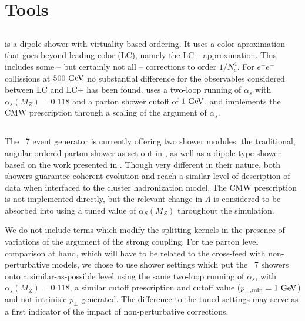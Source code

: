 \section{Tools}
\label{sec:psunc:tools}

\subsection{\Deductor}
\label{sec:psunc:tools:decuctor}

\Deductor \cite{Nagy:2014mqa,Nagy:2014oqa,Nagy:2014nqa,Nagy:2015hwa} is a
dipole shower with virtuality based ordering. It uses a color aproximation
that goes beyond leading color (LC), namely the LC+ approximation. This
includes some -- but certainly not all -- corrections to order $1/N_c^4$. For
$e^+e^-$ collissions at $500\ {\rm GeV}$ no substantial difference for the
observables considered between LC and LC+ has been found.  \Deductor uses a
two-loop running of $\alpha_s$ with $\alpha_s(M_Z)=0.118$ and a parton shower
cutoff of $1\ {\rm GeV}$, and implements the CMW prescription
\cite{Catani:1990rr} through a scaling of the argument of $\alpha_s$.

\subsection{\Herwig}
\label{sec:psunc:tools:herwig}

The \Herwig~7 event generator \cite{Bellm:2015jjp} is currently offering two
shower modules: the traditional, angular ordered parton shower as set out in
\cite{Gieseke:2003rz}, as well as a dipole-type shower based on the work
presented in \cite{Platzer:2009jq,Platzer:2011bc}.
Though very different in their nature, both showers guarantee coherent
evolution and reach a similar level of description of data when interfaced to
the cluster hadronization model. The CMW prescription \cite{Catani:1990rr} is
not implemented directly, but the relevant change in $\Lambda$ is considered
to be absorbed into using a tuned value of $\alpha_S(M_Z)$ throughout the
simulation.

We do not include terms which modify the splitting kernels in the presence of
variations of the argument of the strong coupling. For the parton level
comparison at hand, which will have to be related to the cross-feed with
non-perturbative models, we chose to use shower settings which put the
\Herwig~7 showers onto a similar-as-possible level using the same two-loop
running of $\alpha_s$, with $\alpha_s(M_Z)=0.118$, a similar cutoff
prescription and cutoff value ($p_{\perp,\text{min}}=1\ {\rm GeV}$) and not
intrinisic $p_\perp$ generated. The difference to the tuned settings may serve
as a first indicator of the impact of non-perturbative corrections.


